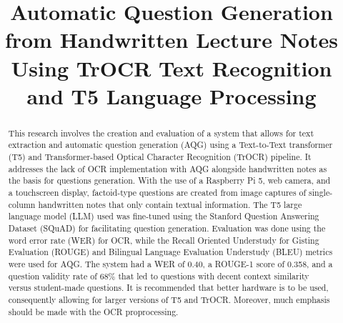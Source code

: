 \documentclass[conference]{IEEEtran}
\begin{document}
\title{Automatic Question Generation from Handwritten 
Lecture Notes Using TrOCR Text Recognition and T5 
Language Processing}
\author{
}


\maketitle

\begin{abstract}
    \indent This research involves the creation and evaluation of a system that allows 
    for text extraction and automatic question generation (AQG) using a 
    Text-to-Text transformer (T5) and Transformer-based 
    Optical Character Recognition (TrOCR) pipeline. It addresses 
    the lack of OCR implementation with AQG alongside
    handwritten notes as the basis for questions generation. 
    With the use of a Raspberry Pi 5, web camera, 
    and a touchscreen display, factoid-type questions are created from image captures of 
    single-column handwritten notes that only contain 
    textual information. The 
    T5 large language model (LLM) used was 
    fine-tuned using the 
    Stanford Question Answering Dataset (SQuAD) for 
    facilitating question 
    generation. Evaluation was done using the word error rate (WER)
    for OCR, while 
    the Recall Oriented Understudy for Gisting Evaluation (ROUGE) 
    and Bilingual Language Evaluation Understudy (BLEU) metrics 
    were used for AQG. The system had a WER of 
    0.40, a ROUGE-1 score of 0.358, and a question validity rate of 
    68\% that led to questions with decent context 
    similarity versus student-made questions. It is recommended that better hardware is to be used, 
    consequently allowing for larger 
    versions of T5 and
    TrOCR. Moreover, much emphasis should be made with 
    the OCR proprocessing.
\end{abstract}
\end{document}
